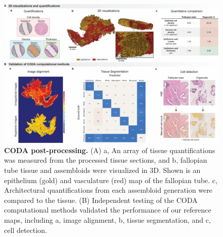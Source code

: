 \begin{refsection}
    \begin{figure}[p]
        \begin{center}
            \includegraphics[width=1\textwidth,height=0.85\textheight,keepaspectratio,clip,page=1]{figures/chapter4/fig_S5.jpg}
            \captionsetup{font=small}
            \caption{\textbf{CODA post-processing.} (A) a, An array of tissue quantifications was measured from the processed tissue sections, and b, fallopian tube tissue and assembloids were visualized in 3D. Shown is an epithelium (gold) and vasculature (red) map of the fallopian tube. c, Architectural quantifications from each assembloid generation were compared to the tissue. (B) Independent testing of the CODA computational methods validated the performance of our reference maps, including a, image alignment, b, tissue segmentation, and c, cell detection.}
            \label{chapter4_figS5}
        \end{center}
    \end{figure}
    
    

\end{refsection}
